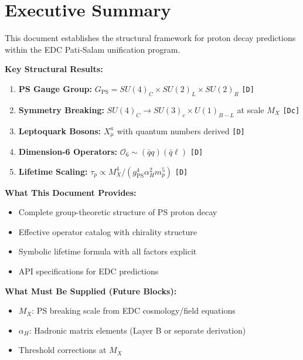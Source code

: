 \documentclass[11pt,a4paper]{article}
\newcommand{\tagD}{\textcolor{green!50!black}{\texttt{[D]}}}
\newcommand{\tagDc}{\textcolor{blue!70!black}{\texttt{[Dc]}}}
\theoremstyle{definition}
\begin{document}
\section{Executive Summary}
\label{sec:executive}


\begin{canonbox}
This document establishes the structural framework for proton decay predictions
within the EDC Pati-Salam unification program.

\textbf{Key Structural Results:}
\begin{enumerate}
  \item \textbf{PS Gauge Group:} $G_{\text{PS}} = SU(4)_C \times SU(2)_L \times SU(2)_R$ \tagD{}
  \item \textbf{Symmetry Breaking:} $SU(4)_C \to SU(3)_c \times U(1)_{B-L}$ at scale $M_X$ \tagDc{}
  \item \textbf{Leptoquark Bosons:} $X_\mu^{a}$ with quantum numbers derived \tagD{}
  \item \textbf{Dimension-6 Operators:} $\mathcal{O}_6 \sim (\bar{q}q)(\bar{q}\ell)$ \tagD{}
  \item \textbf{Lifetime Scaling:} $\tau_p \propto M_X^4 / (g_{\text{PS}}^4 \alpha_H^2 m_p^5)$ \tagD{}
\end{enumerate}

\textbf{What This Document Provides:}
\begin{itemize}
  \item Complete group-theoretic structure of PS proton decay
  \item Effective operator catalog with chirality structure
  \item Symbolic lifetime formula with all factors explicit
  \item API specifications for EDC predictions
\end{itemize}

\textbf{What Must Be Supplied (Future Blocks):}
\begin{itemize}
  \item $M_X$: PS breaking scale from EDC cosmology/field equations
  \item $\alpha_H$: Hadronic matrix elements (Layer B or separate derivation)
  \item Threshold corrections at $M_X$
\end{itemize}
\end{canonbox}
\end{document}
